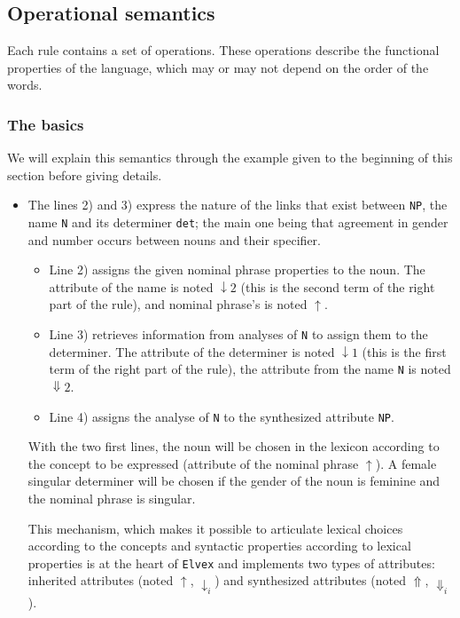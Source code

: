 \documentclass[11pt]{article}
\begin{document}
\subsection{Operational semantics}

Each rule contains a set of operations. These operations describe the
functional properties of the language, which may or may not depend on
the order of the words.

\subsubsection*{The basics}

We will explain this semantics through the example given to the
beginning of this section before giving details.

\begin{itemize}
\item The lines 2) and 3) express the nature of the links that
  exist between \texttt{NP}, the name \texttt{N} and its determiner
  \texttt{det}; the main one being that agreement in gender and number
  occurs between nouns and their specifier.

  \begin{itemize}
  \item Line 2) assigns the given nominal phrase properties to the
    noun. The attribute of the name is noted $\downarrow2$
    (this is the second term of the right part of the rule), and
    nominal phrase's is noted $\uparrow$.

  \item Line 3) retrieves information from analyses of \texttt{N} to
    assign them to the determiner.  The attribute of the determiner
   is noted $\downarrow1$ (this is the first term of the right part
    of the rule), the attribute from the name \texttt{N}
    is noted $\Downarrow2$.

  \item Line 4) assigns the analyse of \texttt{N} to the synthesized
    attribute \texttt{NP}.

  \end{itemize}
  
  With the two first lines, the noun will be chosen in the lexicon
  according to the concept to be expressed (attribute of the nominal
  phrase $\uparrow$).  A female singular determiner will be chosen if
  the gender of the noun is feminine and the nominal phrase is
  singular.
  
  This mechanism, which makes it possible to articulate lexical
  choices according to the concepts and syntactic properties according
  to lexical properties is at the heart of \texttt{Elvex} and
  implements two types of attributes: inherited attributes (noted
  $\uparrow$, $\downarrow_i$) and synthesized attributes (noted
  $\Uparrow$, $\Downarrow_i$).
  

\end{itemize}
\end{document}
